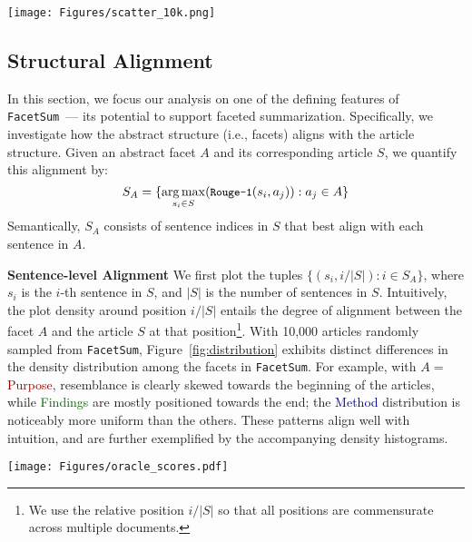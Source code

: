 \documentclass[11pt,a4paper]{article}
\newcommand{\ours}{\texttt{FacetSum}\xspace}
\newcommand{\absp}{\textcolor{darkred}{Purpose}\xspace}
\newcommand{\absm}{\textcolor{darkblue}{Method}\xspace}
\newcommand{\absf}{\textcolor{darkgreen}{Findings}\xspace}
\DeclareMathOperator*{\argmax}{arg\,max}
\begin{document}
\begin{figure*}[t!]
    \centering
\texttt{[image: Figures/scatter\_10k.png]}
    \caption{Oracle sentence distribution over a paper. X-axis: 10,000 papers sampled from \ours, sorted by full text length from long to short; y-axis: normalized position in a paper. We provide each sub-figure's density histogram on their right.}
    \label{fig:distribution}
\end{figure*}

\subsection{Structural Alignment}
\label{subsection:structural_alignment}
In this section, we focus our analysis on one of the defining features of \ours\ --- its potential to support faceted summarization.
Specifically, we investigate how the abstract structure (i.e., facets) aligns with the article structure.
Given an abstract facet $A$ and its corresponding article $S$, we quantify this alignment by:
\begin{equation}
    \label{eqn:s_a_alignment}
    \small
    S_A=\{\argmax_{s_i\in S}(\texttt{Rouge-1}(s_i,a_j)):a_j\in A\}
\end{equation}
Semantically, $S_{A}$ consists of sentence indices in $S$ that best align with each sentence in $A$.





\noindent\textbf{Sentence-level Alignment}\quad
We first plot the tuples $\{(s_i,i/|S|):i\in S_{A}\}$, where $s_i$ is the $i$-th sentence in $S$, and $|S|$ is the number of sentences in $S$.
Intuitively, the plot density around position $i/|S|$ entails the degree of alignment between the facet $A$ and the article $S$ at that position\footnote{We use the relative position $i/|S|$ so that all positions are commensurate across multiple documents.}.
With 10,000 articles randomly sampled from \ours, Figure~\ref{fig:distribution} exhibits distinct differences in the density distribution among the facets in \ours.
For example, with $A=$ \absp, resemblance is clearly skewed towards the beginning of the articles,
while \absf are mostly positioned towards the end; the \absm distribution is noticeably more uniform than the others.
These patterns align well with intuition, and are further exemplified by the accompanying density histograms.

\begin{table}[t!]
    \centering
    \texttt{[image: Figures/oracle\_scores.pdf]}
    \caption{Scores of sentence aligning in Rouge-L.}
    \label{table:oracle_scores_rl}
\end{table}
\end{document}
